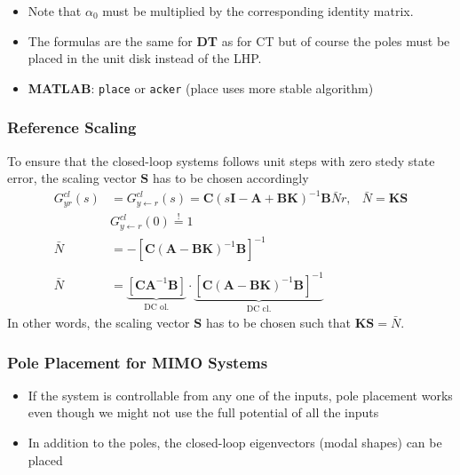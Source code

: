 \newpar{}

\begin{itemize}
    \item Note that $\alpha_0$ must be multiplied by the corresponding identity matrix.
    \item The formulas are the same for \textbf{DT} as for CT but of course the poles must be placed in the unit disk instead of the LHP.
    \item \textbf{MATLAB}: \texttt{place} or \texttt{acker} (place uses more stable algorithm)
\end{itemize}

\subsubsection{Reference Scaling}
To ensure that the closed-loop systems follows unit steps with zero stedy state error, the scaling vector $\mathbf{S}$ has to be chosen accordingly
\noindent\begin{align*}
    G_{yr}^{cl}(s) & = G_{y\leftarrow r}^{cl}(s) =\mathbf{C}{(s\mathbf{I}-\mathbf{A}+\mathbf{BK})}^{-1}\mathbf{B}\bar{N}r,                                                                          & \bar{N}=\mathbf{KS} \\
                   & G_{y\leftarrow r}^{cl}(0)  \overset{!}{=} 1                                                                                                                                                          \\
    \bar{N}        & =-{\left[\mathbf{C}{(\mathbf{A}-\mathbf{BK})}^{-1}\mathbf{B}\right]}^{-1}                                                                                                                            \\\\
    \bar{N}        & =\underbrace{\left[\mathbf{CA}^{-1}\mathbf{B}\right]}_{\text{DC ol.}}\cdot\underbrace{{\left[\mathbf{C}{(\mathbf{A}-\mathbf{BK})}^{-1}\mathbf{B}\right]}^{-1}}_{\text{DC cl.}}
\end{align*}
In other words, the scaling vector $\mathbf{S}$ has to be chosen such that $\mathbf{KS}=\bar{N}$.

\subsubsection{Pole Placement for MIMO Systems}
\begin{itemize}
    \item If the system is controllable from any one of the inputs, pole placement works even though we might not use the full potential of all the inputs
    \item In addition to the poles, the closed-loop eigenvectors (modal shapes) can be placed
\end{itemize}
